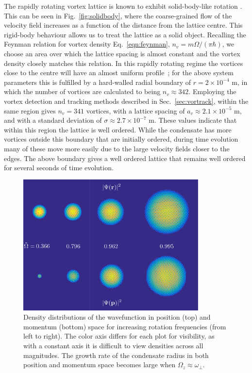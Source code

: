 The rapidly rotating vortex lattice is known to exhibit solid-body-like rotation \cite{Vtx:AboShaeer_sci_2001}. This can be seen in Fig.~\ref{fig:solidbody}, where the coarse-grained flow of the velocity field increases as a function of the distance from the lattice centre. This rigid-body behaviour allows us to treat the lattice as a solid object. Recalling the Feynman relation for vortex density Eq.~\eqref{eqn:feynman}, $n_v = m\Omega/(\pi\hbar)$, we choose an area over which the lattice spacing is almost constant and the vortex density closely matches this relation. In this rapidly rotating regime the vortices close to the centre will have an almost uniform profile~\cite{VTX:Watanabe_pra_2006}; for the above system parameters this is fulfilled by a hard-walled radial boundary of $r=2\times 10^{-4}$ m, in which the number of vortices are calculated to being $n_v \approx 342$. Employing the vortex detection and tracking methods described in Sec.~\ref{sec:vortrack}, within the same region gives $n_v = 341$ vortices, with a lattice spacing of $a_v \approx 2.1\times 10^{-5}$ m, and with a standard deviation of $\sigma \approx 2.7 \times 10^{-7}$ m. These values indicate that within this region the lattice is well ordered. While the condensate has more vortices outside this boundary that are initially ordered, during time evolution many of these move more easily due to the large velocity fields closer to the edges. The above boundary gives a well ordered lattice that remains well ordered for several seconds of time evolution.

\begin{figure}\centering
    \includegraphics[width=0.85\textwidth]{Images/ch4_vtx/ramp_omega_2.pdf}
    \caption{Density distributions of the wavefunction in position (top) and momentum (bottom) space for increasing rotation frequencies (from left to right). The color axis differs for each plot for visibility, as with a constant axis it is difficult to view densities across all magnitudes. The growth rate of the condensate radius in both position and momentum space becomes large when $\Omega_z \approx \omega_\perp$.}
    \label{fig:inc_omega}
\end{figure}

